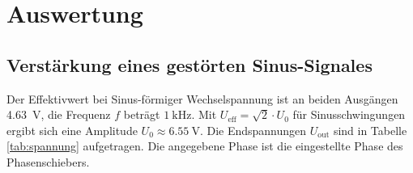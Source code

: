 \newpage
\section{Auswertung}
\label{sec:Auswertung}
\subsection{Verstärkung eines gestörten Sinus-Signales}
\label{sec:Auswertung1}
Der Effektivwert bei Sinus-förmiger Wechselspannung ist an beiden Ausgängen \SI{4.63}{\volt}, die Frequenz $f$ beträgt $\SI{1}{\kilo\hertz}$.
Mit $U_\text{eff}=\sqrt{2}\cdot U_0$ für Sinusschwingungen ergibt sich eine Amplitude $U_0\approx \SI{6.55}{\volt}$.
Die Endspannungen $U_\text{out}$ sind in Tabelle \ref{tab:spannung} aufgetragen. 
Die angegebene Phase ist die eingestellte Phase des Phasenschiebers.


